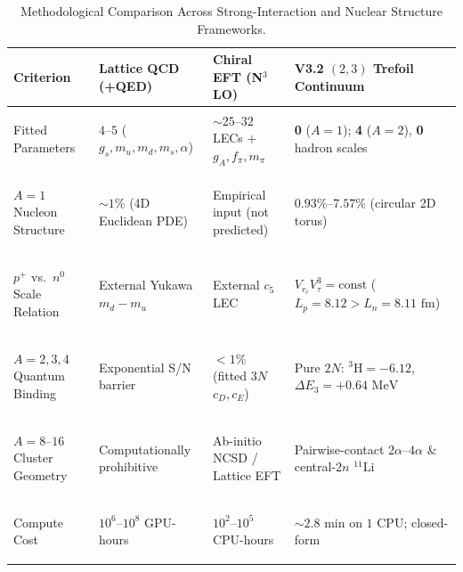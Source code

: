 \documentclass[11pt, a4paper]{article}
\begin{document}
\begin{table}[!htbp]
\centering
\caption{Methodological Comparison Across Strong-Interaction and Nuclear Structure Frameworks.}
\label{tab:framework_comparison}
\footnotesize
\setlength{\tabcolsep}{4.5pt}
\renewcommand{\arraystretch}{1.16}
\begin{tabularx}{\textwidth}{>{\bfseries\raggedright\arraybackslash}p{} >{\raggedright\arraybackslash}X >{\raggedright\arraybackslash}X >{\raggedright\arraybackslash}X}
\toprule
Criterion & Lattice QCD (+QED) & Chiral EFT (N$^3$LO) & V3.2 $(2,3)$ Trefoil Continuum \\
\midrule
Fitted Parameters & $4\text{--}5$ ($g_s, m_u, m_d, m_s, \alpha$) & ${\sim}25\text{--}32$ LECs + $g_A, f_\pi, m_\pi$ & \textbf{0} ($A=1$); \textbf{4} ($A=2$), \textbf{0} hadron scales \\
$A = 1$ Nucleon Structure & ${\sim}1\%$ (4D Euclidean PDE) & Empirical input (not predicted) & $\mathbf{0.93\%\text{--}7.57\%}$ (circular 2D torus) \\
$p^+$ vs.\ $n^0$ Scale Relation & External Yukawa $m_d - m_u$ & External $c_5$ LEC & $V_{r_c}V_\tau^3=\text{const}$ ($L_p=8.12 > L_n=8.11\text{ fm}$) \\
$A = 2, 3, 4$ Quantum Binding & Exponential S/N barrier & $< 1\%$ (fitted $3N$ $c_D, c_E$) & Pure $2N$: $^3\text{H}=-6.12$, $\Delta E_3=+0.64\text{ MeV}$ \\
$A = 8\text{--}16$ Cluster Geometry & Computationally prohibitive & Ab-initio NCSD / Lattice EFT & Pairwise-contact $2\alpha\text{--}4\alpha$ \& central-$2n$ $^{11}\text{Li}$ \\
Compute Cost & $10^6\text{--}10^8$ GPU-hours & $10^2\text{--}10^5$ CPU-hours & ${\sim}2.8\text{ min}$ on $1$ CPU; closed-form \\
\bottomrule
\end{tabularx}
\end{table}
\end{document}
